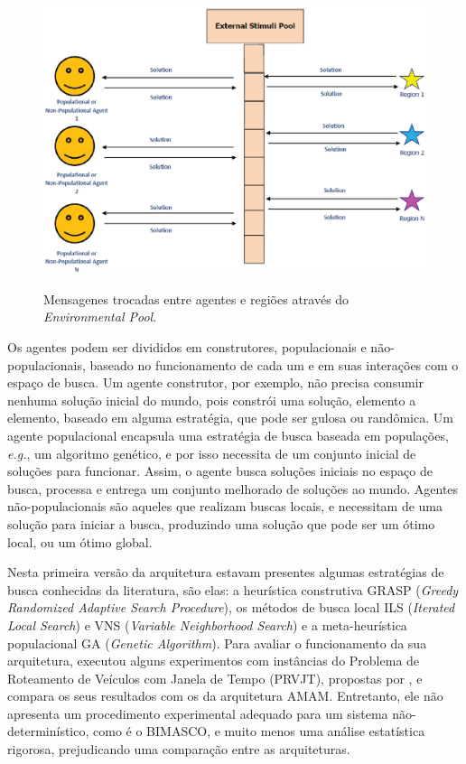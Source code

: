 \begin{figure}
    \centering
    \caption{Mensagenes trocadas entre agentes e regiões através do \textit{Environmental Pool}.}
    \includegraphics[scale=0.5]{imagens/external-pool-saliba.eps}
    \label{fig:bimasco_env_pool}
\end{figure}

Os agentes podem ser divididos em construtores, populacionais e não-populacionais, baseado no funcionamento de cada um e em suas interações com o espaço de busca. Um agente construtor, por exemplo, não precisa consumir nenhuma solução inicial do mundo, pois constrói uma solução, elemento a elemento, baseado em alguma estratégia, que pode ser gulosa ou randômica. Um agente populacional encapsula uma estratégia de busca baseada em populações, \textit{e.g.}, um algoritmo genético, e por isso necessita de um conjunto inicial de soluções para funcionar. Assim, o agente busca soluções iniciais no espaço de busca, processa e entrega um conjunto melhorado de soluções ao mundo. Agentes não-populacionais são aqueles que realizam buscas locais, e necessitam de uma solução para iniciar a busca, produzindo uma solução que pode ser um ótimo local, ou um ótimo global. 

Nesta primeira versão da arquitetura estavam presentes algumas estratégias de busca conhecidas da literatura, são elas: a heurística construtiva GRASP (\textit{Greedy Randomized Adaptive Search Procedure}), os métodos de busca local ILS (\textit{Iterated Local Search}) e VNS (\textit{Variable Neighborhood Search}) e a meta-heurística populacional GA (\textit{Genetic Algorithm}). Para avaliar o funcionamento da sua arquitetura,  executou alguns experimentos com instâncias do Problema de Roteamento de Veículos com Janela de Tempo (PRVJT), propostas por , e compara os seus resultados com os da arquitetura AMAM. Entretanto, ele não apresenta um procedimento experimental adequado para um sistema não-determinístico, como é o BIMASCO, e muito menos uma análise estatística rigorosa, prejudicando uma comparação entre as arquiteturas. 

